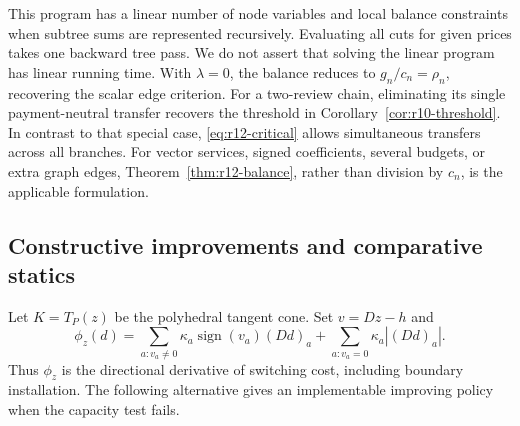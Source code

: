 This program has a linear number of node variables and local balance constraints when subtree sums are represented recursively. Evaluating all cuts for given prices takes one backward tree pass. We do not assert that solving the linear program has linear running time. With $\lambda=0$, the balance reduces to $g_n/c_n=\rho_n$, recovering the scalar edge criterion. For a two-review chain, eliminating its single payment-neutral transfer recovers the threshold in Corollary~\ref{cor:r10-threshold}. In contrast to that special case, \eqref{eq:r12-critical} allows simultaneous transfers across all branches. For vector services, signed coefficients, several budgets, or extra graph edges, Theorem~\ref{thm:r12-balance}, rather than division by $c_n$, is the applicable formulation.

\subsection{Constructive improvements and comparative statics}
Let $K=T_P(z)$ be the polyhedral tangent cone. Set $v=Dz-h$ and
\[
 \phi_z(d)=\sum_{a:v_a\ne0}\kappa_a\operatorname{sign}(v_a)(Dd)_a
                +\sum_{a:v_a=0}\kappa_a|(Dd)_a|.
\]
Thus $\phi_z$ is the directional derivative of switching cost, including boundary installation. The following alternative gives an implementable improving policy when the capacity test fails.

